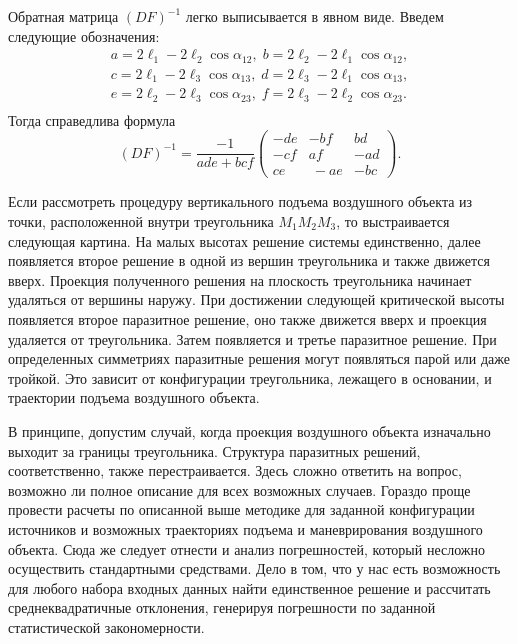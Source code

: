\documentclass[../main.tex]{subfiles}
\begin{document}
Обратная матрица $(DF)^{-1}$ легко выписывается в явном виде. Введем следующие обозначения:
\begin {equation}
  \begin {matrix}
   a= 2\ell_1 - 2\ell_2 \cos \alpha_{12}, \; b= 2\ell_2 - 2\ell_1 \cos \alpha_{12}, \\
   c= 2\ell_1 - 2\ell_3 \cos \alpha_{13}, \; d= 2\ell_3 - 2\ell_1 \cos \alpha_{13}, \\
   e= 2\ell_2 - 2\ell_3 \cos \alpha_{23}, \; f= 2\ell_3 - 2\ell_2 \cos \alpha_{23}. \\
  \end {matrix}
  \label {abc}
\end {equation}
Тогда справедлива формула
\begin{equation}
  (DF)^{-1} = \frac {-1} {ade+bcf}
  \left(
    \begin{array}{ccc}
      -de & -bf & bd \\
      -cf &  af & -ad \\
      ce  &\ -ae & -bc
    \end{array}
  \right) .
\label {DF_m1}
\end{equation}

Если рассмотреть процедуру вертикального подъема воздушного объекта из точки, расположенной внутри треугольника $M_1 M_2 M_3$, то выстраивается следующая картина. На малых высотах решение системы единственно, далее появляется второе решение в одной из вершин треугольника и также движется вверх. Проекция полученного решения на плоскость треугольника начинает удаляться от вершины наружу. При достижении следующей критической высоты появляется второе паразитное решение, оно также движется вверх и проекция удаляется от треугольника. Затем появляется и третье паразитное решение. При определенных симметриях паразитные решения могут появляться парой или даже тройкой. Это зависит от конфигурации треугольника, лежащего в основании, и траектории подъема воздушного объекта.

В принципе, допустим случай, когда проекция воздушного объекта изначально выходит за границы треугольника. Структура паразитных решений, соответственно, также перестраивается. Здесь сложно ответить на вопрос, возможно ли полное описание для всех возможных случаев. Гораздо проще провести расчеты по описанной выше методике для заданной конфигурации источников и возможных траекториях подъема и маневрирования воздушного объекта. Сюда же следует отнести и анализ погрешностей, который несложно осуществить стандартными средствами. Дело в том, что у нас есть возможность для любого набора входных данных найти единственное решение и рассчитать среднеквадратичные отклонения, генерируя погрешности по заданной статистической закономерности.
\end{document}

